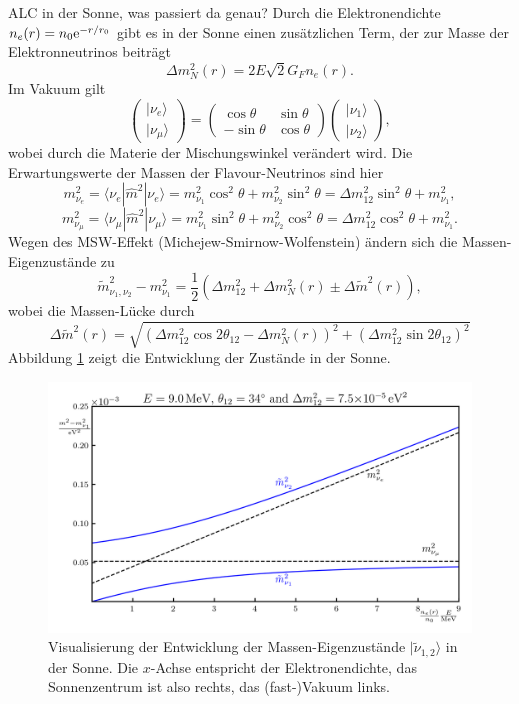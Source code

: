 \begin{fquestion}{ALC in der Sonne, was passiert da genau?}
    Durch die Elektronendichte $n_e(r) = n_0\text{e}^{-r/r_0}$ gibt es in der Sonne einen zusätzlichen Term, der zur Masse der Elektronneutrinos beiträgt $$\Delta m_N^2(r) = 2E\sqrt{2}G_F n_e(r).$$
    Im Vakuum gilt
    $$\begin{pmatrix}
     | \nu_e \rangle \\  | \nu_\mu  \rangle
    \end{pmatrix} = \begin{pmatrix}
    \cos\theta & \sin\theta \\ -\sin\theta & \cos\theta
    \end{pmatrix} \begin{pmatrix}
     | \nu_1 \rangle \\  | \nu_2 \rangle
    \end{pmatrix},$$
    wobei durch die Materie der Mischungswinkel verändert wird.
    Die Erwartungswerte der Massen der Flavour-Neutrinos sind hier
    $$m_{\nu_e}^2 = \langle \nu_e | \hat{m}^2 | \nu_e \rangle = m_{\nu_1}^2 \cos^2\theta + m_{\nu_2}^2 \sin^2\theta = \Delta m_{12}^2 \sin^2\theta + m_{\nu_1}^2,$$
    $$m_{\nu_\mu}^2 = \langle \nu_\mu | \hat{m}^2 | \nu_\mu \rangle = m_{\nu_1}^2 \sin^2\theta + m_{\nu_2}^2 \cos^2\theta = \Delta m_{12}^2 \cos^2\theta + m_{\nu_1}^2.$$
    Wegen des MSW-Effekt (Michejew-Smirnow-Wolfenstein) ändern sich die Massen-Eigenzustände zu
   $$\tilde{m}^2_{\nu_1,\nu_2} - m_{\nu_1}^2 = \frac{1}{2}\left( \Delta m_{12}^2 + \Delta m_N^2(r) \pm \Delta \tilde{m}^2(r) \right),$$
    wobei die Massen-Lücke durch
    $$\Delta \tilde{m}^2(r) = \sqrt{\left( \Delta m_{12}^2 \cos 2\theta_{12} - \Delta m_N^2 (r) \right)^2 + \left( \Delta m_{12}^2 \sin 2\theta_{12} \right)^2 }$$
    Abbildung \ref{fig:solar neutrino msw theta 34} zeigt die Entwicklung der Zustände in der Sonne.
\end{fquestion}

\begin{figure}[!ht]
    \centering
    \includegraphics{img/SolarNeutrinoALC_theta34v3.png}
    \caption{Visualisierung der Entwicklung der Massen-Eigenzustände $ | \tilde{\nu}_{1,2} \rangle$ in der Sonne.
    Die $x$-Achse entspricht der Elektronendichte, das Sonnenzentrum ist also rechts, das (fast-)Vakuum links.}
    \label{fig:solar neutrino msw theta 34}
\end{figure}

